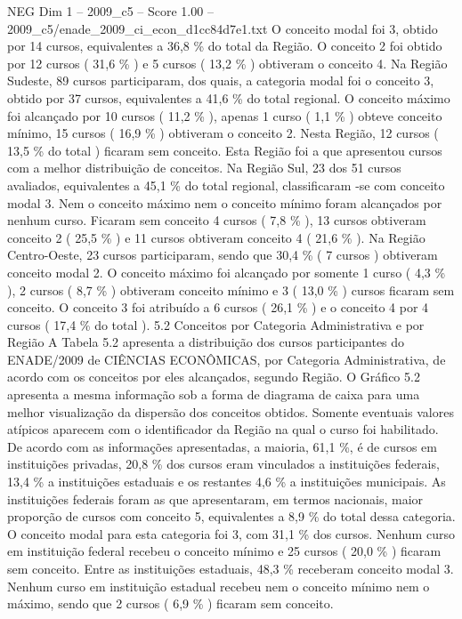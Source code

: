 \begin{textsample}{NEG Dim 1 – 2009\_c5 – Score 1.00 – 2009\_c5/enade\_2009\_ci\_econ\_d1cc84d7e1.txt}
O conceito modal foi 3, obtido por 14 cursos, equivalentes a 36,8 \% do total da Região.
O conceito 2 foi obtido por 12 cursos ( 31,6 \% ) e 5 cursos ( 13,2 \% ) obtiveram o conceito 4.
Na Região Sudeste, 89 cursos participaram, dos quais, a categoria modal foi o conceito 3, obtido por 37 cursos, equivalentes a 41,6 \% do total regional.
O conceito máximo foi alcançado por 10 cursos ( 11,2 \% ), apenas 1 curso ( 1,1 \% ) obteve conceito mínimo, 15 cursos ( 16,9 \% ) obtiveram o conceito 2.
Nesta Região, 12 cursos ( 13,5 \% do total ) ficaram sem conceito.
Esta Região foi a que apresentou cursos com a melhor distribuição de conceitos.
Na Região Sul, 23 dos 51 cursos avaliados, equivalentes a 45,1 \% do total regional, classificaram -se com conceito modal 3.
Nem o conceito máximo nem o conceito mínimo foram alcançados por nenhum curso.
Ficaram sem conceito 4 cursos ( 7,8 \% ), 13 cursos obtiveram conceito 2 ( 25,5 \% ) e 11 cursos obtiveram conceito 4 ( 21,6 \% ).
Na Região Centro-Oeste, 23 cursos participaram, sendo que 30,4 \% ( 7 cursos ) obtiveram conceito modal 2.
O conceito máximo foi alcançado por somente 1 curso ( 4,3 \% ), 2 cursos ( 8,7 \% ) obtiveram conceito mínimo e 3 ( 13,0 \% ) cursos ficaram sem conceito.
O conceito 3 foi atribuído a 6 cursos ( 26,1 \% ) e o conceito 4 por 4 cursos ( 17,4 \% do total ). 5.2 Conceitos por Categoria Administrativa e por Região A Tabela 5.2 apresenta a distribuição dos cursos participantes do ENADE/2009 de CIÊNCIAS ECONÔMICAS, por Categoria Administrativa, de acordo com os conceitos por eles alcançados, segundo Região.
O Gráfico 5.2 apresenta a mesma informação sob a forma de diagrama de caixa para uma melhor visualização da dispersão dos conceitos obtidos.
Somente eventuais valores atípicos aparecem com o identificador da Região na qual o curso foi habilitado.
De acordo com as informações apresentadas, a maioria, 61,1 \%, é de cursos em instituições privadas, 20,8 \% dos cursos eram vinculados a instituições federais, 13,4 \% a instituições estaduais e os restantes 4,6 \% a instituições municipais.
As instituições federais foram as que apresentaram, em termos nacionais, maior proporção de cursos com conceito 5, equivalentes a 8,9 \% do total dessa categoria.
O conceito modal para esta categoria foi 3, com 31,1 \% dos cursos.
Nenhum curso em instituição federal recebeu o conceito mínimo e 25 cursos ( 20,0 \% ) ficaram sem conceito.
Entre as instituições estaduais, 48,3 \% receberam conceito modal 3.
Nenhum curso em instituição estadual recebeu nem o conceito mínimo nem o máximo, sendo que 2 cursos ( 6,9 \% ) ficaram sem conceito.

\end{textsample}
